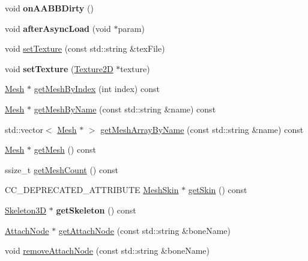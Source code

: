\begin{DoxyCompactItemize}
\mbox{\label{classSprite3D_a4c88e570782521866b678e1ef11a4056}} 
void {\bfseries on\+A\+A\+B\+B\+Dirty} ()
\item 
\mbox{\label{classSprite3D_aa57b9816873f80ce96644e1adcfbf747}} 
void {\bfseries after\+Async\+Load} (void $\ast$param)
\item 
void \hyperlink{classSprite3D_af6dc6865a71a7e768a089e5d2704b7dc}{set\+Texture} (const std\+::string \&tex\+File)
\item 
\mbox{\label{classSprite3D_a0722b001b9e876d506b540621bdac1f4}} 
void {\bfseries set\+Texture} (\hyperlink{classTexture2D}{Texture2D} $\ast$texture)
\item 
\hyperlink{classMesh}{Mesh} $\ast$ \hyperlink{classSprite3D_aec899f921445251fc0011a5bc31c1b2d}{get\+Mesh\+By\+Index} (int index) const
\item 
\hyperlink{classMesh}{Mesh} $\ast$ \hyperlink{classSprite3D_a2f2ae610e50e0c8c7e5f6713bebd8a09}{get\+Mesh\+By\+Name} (const std\+::string \&name) const
\item 
std\+::vector$<$ \hyperlink{classMesh}{Mesh} $\ast$ $>$ \hyperlink{classSprite3D_a5e23abd1b0979b3a8e90b2028ab1c5e7}{get\+Mesh\+Array\+By\+Name} (const std\+::string \&name) const
\item 
\hyperlink{classMesh}{Mesh} $\ast$ \hyperlink{classSprite3D_ad3f22d4c57c9320ab42e08bf9c97363d}{get\+Mesh} () const
\item 
ssize\+\_\+t \hyperlink{classSprite3D_a472b051ff3eb91ceaf56eee60257ccae}{get\+Mesh\+Count} () const
\item 
C\+C\+\_\+\+D\+E\+P\+R\+E\+C\+A\+T\+E\+D\+\_\+\+A\+T\+T\+R\+I\+B\+U\+TE \hyperlink{classMeshSkin}{Mesh\+Skin} $\ast$ \hyperlink{classSprite3D_a3dc3117e72c4bcd841e7fd4ee56f2b98}{get\+Skin} () const
\item 
\mbox{\label{classSprite3D_a4bee3bcf9f3ef37190455fc1063d4473}} 
\hyperlink{classSkeleton3D}{Skeleton3D} $\ast$ {\bfseries get\+Skeleton} () const
\item 
\hyperlink{classAttachNode}{Attach\+Node} $\ast$ \hyperlink{classSprite3D_aca7485ada08a322bf2059377e7ee8603}{get\+Attach\+Node} (const std\+::string \&bone\+Name)
\item 
void \hyperlink{classSprite3D_a39e52d6b3fc8cf7e8fe5dfb047880308}{remove\+Attach\+Node} (const std\+::string \&bone\+Name)

\end{DoxyCompactItemize}
